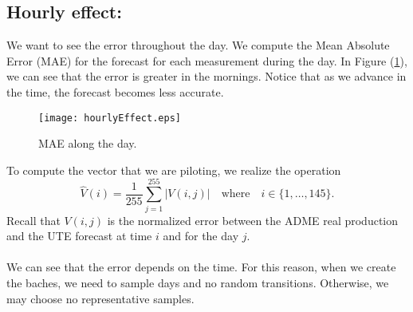 \documentclass[12pt]{article}
\theoremstyle{definition}
\theoremstyle{remark}
\begin{document}
\pagebreak 

\subsection*{Hourly effect:}

We want to see the error throughout the day. We compute the Mean Absolute Error (MAE) for the forecast for each measurement during the day. In Figure (\ref{plot2}), we can see that the error is greater in the mornings. Notice that as we advance in the time, the forecast becomes less accurate.

\begin{figure}[ht!]
\centering
{\texttt{[image: hourlyEffect.eps]}}
\caption{MAE along the day.}\label{plot2}
\end{figure}

To compute the vector that we are piloting, we realize the operation
\begin{equation*}
\hat{V}(i) =\frac{1}{255} \sum_{j=1}^{255}|V(i,j)|\quad\text{where}\quad i\in\{1,\dots,145\}.
\end{equation*}
Recall that $V(i,j)$ is the normalized error between the ADME real production and the UTE forecast at time $i$ and for the day $j$.\\
\quad\\
{\color{red} We can see that the error depends on the time. For this reason, when we create the baches, we need to sample days and no random transitions. Otherwise, we may choose no representative samples.}

\pagebreak 

%
%
%
\end{document}
